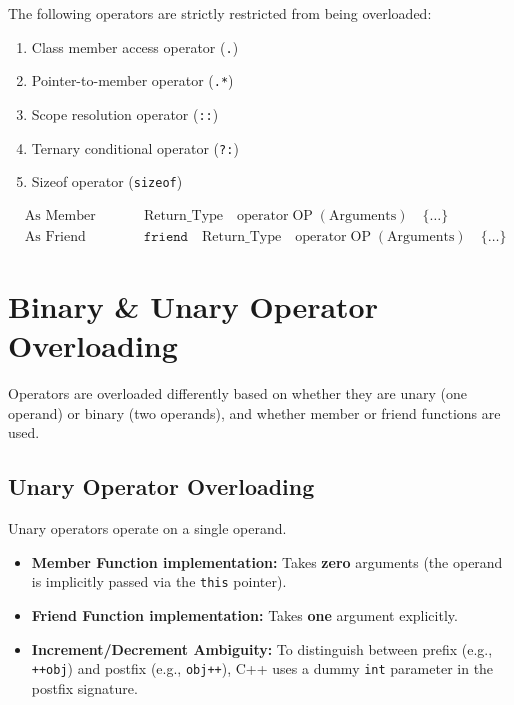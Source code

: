 \documentclass[12pt,a4paper]{article}
\begin{document}
\begin{tcolorbox}[defbox, title={\textbf{List of Operators that Cannot be Overloaded}}]
The following operators are strictly restricted from being overloaded:
\begin{enumerate}[label=\textbf{\arabic*.}, leftmargin=2em, itemsep=1pt]
  \item Class member access operator (\texttt{.})
  \item Pointer-to-member operator (\texttt{.*})
  \item Scope resolution operator (\texttt{::})
  \item Ternary conditional operator (\texttt{?:})
  \item Sizeof operator (\texttt{sizeof})
\end{enumerate}
\end{tcolorbox}

\begin{tcolorbox}[formulabox, title={\textbf{Operator Overloading Signature Syntax}}]
\begin{align}
  &\text{As Member Function: } && \text{Return\_Type} \quad \text{operator}\;\text{OP}\;(\text{Arguments}) \quad \{ \dots \} \\
  &\text{As Friend Function: } && \texttt{friend} \quad \text{Return\_Type} \quad \text{operator}\;\text{OP}\;(\text{Arguments}) \quad \{ \dots \}
\end{align}
\end{tcolorbox}

\section{Binary \& Unary Operator Overloading}

Operators are overloaded differently based on whether they are unary (one operand) or binary (two operands), and whether member or friend functions are used.

\subsection{Unary Operator Overloading}
Unary operators operate on a single operand.
\begin{itemize}[leftmargin=*, itemsep=3pt]
  \item \textbf{Member Function implementation:} Takes \textbf{zero} arguments (the operand is implicitly passed via the \texttt{this} pointer).
  \item \textbf{Friend Function implementation:} Takes \textbf{one} argument explicitly.
  \item \textbf{Increment/Decrement Ambiguity:} To distinguish between prefix (e.g., \texttt{++obj}) and postfix (e.g., \texttt{obj++}), C++ uses a dummy \texttt{int} parameter in the postfix signature.
\end{itemize}
\end{document}
